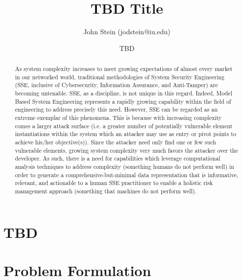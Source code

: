 \documentclass[11pt]{article}
\title{TBD Title}
\author{John Stein (jodstein@iu.edu)}
\date{TBD}
\begin{document}
\begin{titlepage}
    \null
    \nointerlineskip
    \vfill
    \let\snewpage \newpage
    \let\newpage \relax
    \maketitle
    \let \newpage \snewpage
    \vfill
    \thispagestyle{empty}
\end{titlepage}


\tableofcontents
\thispagestyle{empty}


\newpage
\setcounter{page}{1}

\begin{abstract}
    As system complexity increases to meet growing expectations of almost every market in our networked world, traditional methodologies of System Security Engineering (SSE, inclusive of Cybersecurity, Information Assurance, and Anti-Tamper) are becoming untenable.  SSE, as a discipline, is not unique in this regard.  Indeed, Model Based System Engineering represents a rapidly growing capability within the field of engineering to address precisely this need.  However, SSE can be regarded as an extreme exemplar of this phenomena.  This is because with increasing complexity comes a larger attack surface (i.e. a greater number of potentially vulnerable element instantiations within the system which an attacker may use as entry or pivot points to achieve his/her objective(s)).  Since the attacker need only find one or few such vulnerable elements, growing system complexity very much favors the attacker over the developer.  As such, there is a need for capabilities which leverage computational analysis techniques to address complexity (something humans do not perform well) in order to generate a comprehensive-but-minimal data representation that is informative, relevant, and actionable to a human SSE practitioner to enable a holistic risk management approach (something that machines do not perform well).
\end{abstract}

\section{TBD}

\section{Problem Formulation}
\end{document}
